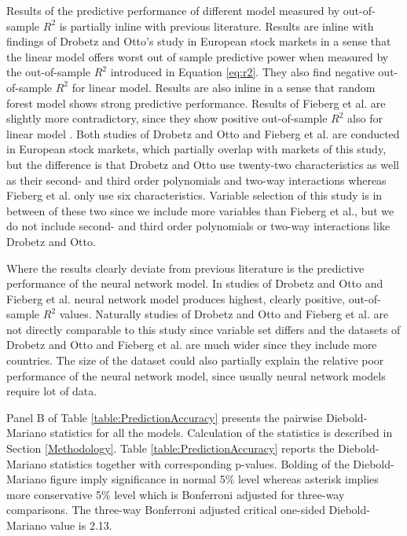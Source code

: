 \documentclass{article}
\begin{document}
Results of the predictive performance of different model measured by out-of-sample $R^2$ is partially inline with previous literature. Results are inline with findings of Drobetz and Otto's \citeyear{Drobetz} study in European stock markets in a sense that the linear model offers worst out of sample predictive power when measured by the out-of-sample $R^2$ introduced in Equation \ref{eq:r2}. They also find negative out-of-sample $R^2$ for linear model. Results are also inline in a sense that random forest model shows strong predictive performance. Results of Fieberg et al. \citeyear{Fieberg} are slightly more contradictory, since they show positive out-of-sample $R^2$ also for linear model \footnotemark. Both studies of Drobetz and Otto and Fieberg et al. are conducted in European stock markets, which partially overlap with markets of this study, but the difference is that Drobetz and Otto use twenty-two characteristics as well as their  second- and third order polynomials and two-way interactions whereas Fieberg et al. only use six characteristics. Variable selection of this study is in between of these two since we include more variables than Fieberg et al., but we do not include second- and third order polynomials or two-way interactions like Drobetz and Otto. \par


Where the results clearly deviate from previous literature is the predictive performance of the neural network model. In studies of Drobetz and Otto \citeyear{Drobetz} and Fieberg et al. \citeyear{Fieberg} neural network model produces highest, clearly positive, out-of-sample $R^2$ values. Naturally studies of Drobetz and Otto and Fieberg et al. are not directly comparable to this study since variable set differs and the datasets of  Drobetz and Otto and Fieberg et al. are much wider since they include more countries. The size of the dataset could also partially explain the relative poor performance of the neural network model, since usually neural network models require lot of data. \par

Panel B of Table \ref{table:PredictionAccuracy} presents the pairwise Diebold-Mariano statistics for all the models. Calculation of the statistics is described in Section \ref{Methodology}. Table \ref{table:PredictionAccuracy} reports the Diebold-Mariano statistics together with corresponding p-values. Bolding of the Diebold-Mariano figure imply significance in normal 5\% level whereas asterisk implies more conservative 5\% level which is Bonferroni adjusted for three-way comparisons. The three-way Bonferroni adjusted critical one-sided Diebold-Mariano value is 2.13. \par
\end{document}
